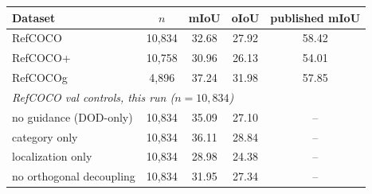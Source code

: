\begin{tabular}{lcccc}
\toprule
Dataset & $n$ & mIoU & oIoU & published mIoU \\
\midrule
RefCOCO & 10,834 & 32.68 & 27.92 & 58.42 \\
RefCOCO+ & 10,758 & 30.96 & 26.13 & 54.01 \\
RefCOCOg & 4,896 & 37.24 & 31.98 & 57.85 \\
\midrule
\multicolumn{5}{l}{\emph{RefCOCO val controls, this run ($n{=}10{,}834$)}}\\
\quad no guidance (DOD-only) & 10,834 & 35.09 & 27.10 & -- \\
\quad category only & 10,834 & 36.11 & 28.84 & -- \\
\quad localization only & 10,834 & 28.98 & 24.38 & -- \\
\quad no orthogonal decoupling & 10,834 & 31.95 & 27.34 & -- \\
\bottomrule
\end{tabular}
